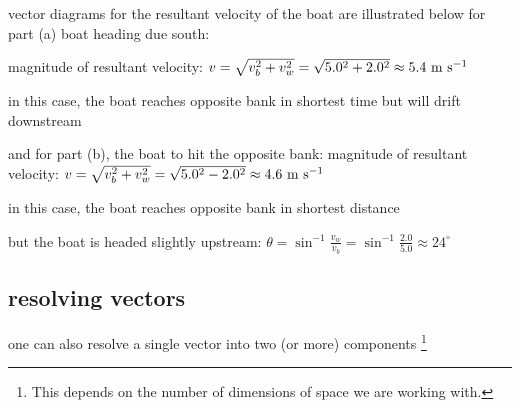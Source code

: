 \begin{soln} vector diagrams for the resultant velocity of the boat are illustrated below for part (a) boat heading due south:

magnitude of resultant velocity: $v = \sqrt{v_b^2 + v_w^2} = \sqrt{5.0^2 +2.0^2} \approx 5.4 \text{ m s$^{-1}$}$

in this case, the boat reaches opposite bank in shortest time but will drift downstream
\end{soln}
\begin{figure}
		\centering
		
\end{figure}		
\begin{soln}
and for part (b), the boat to hit the opposite bank:
magnitude of resultant velocity: $v = \sqrt{v_b^2 + v_w^2} = \sqrt{5.0^2 -2.0^2} \approx 4.6 \text{ m s$^{-1}$}$
	
	in this case, the boat reaches opposite bank in shortest distance
	
	but the boat is headed slightly upstream: $\theta = \sin^{-1} \frac{v_w}{v_b} = \sin^{-1}\frac{2.0}{5.0} \approx 24^\circ$
\end{soln}		
  
\begin{figure}	
		\centering
\end{figure}




\subsection{resolving vectors}

one can also resolve a single vector into two (or more) components
\footnote{This depends on the number of dimensions of space we are working with.}

